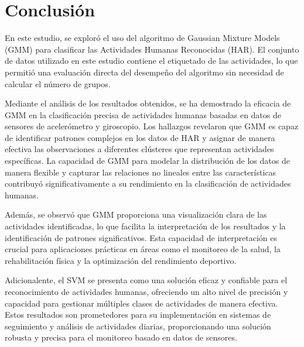 \documentclass{esannV2}
\begin{document}
\section{Conclusión}
En este estudio, se exploró el uso del algoritmo de Gaussian Mixture Models (GMM) para clasificar las Actividades Humanas Reconocidas (HAR). El conjunto de datos utilizado en este estudio contiene el etiquetado de las actividades, lo que permitió una evaluación directa del desempeño del algoritmo sin necesidad de calcular el número de grupos.

Mediante el análisis de los resultados obtenidos, se ha demostrado la eficacia de GMM en la clasificación precisa de actividades humanas basadas en datos de sensores de acelerómetro y giroscopio. Los hallazgos revelaron que GMM es capaz de identificar patrones complejos en los datos de HAR y asignar de manera efectiva las observaciones a diferentes clústeres que representan actividades específicas. La capacidad de GMM para modelar la distribución de los datos de manera flexible y capturar las relaciones no lineales entre las características contribuyó significativamente a su rendimiento en la clasificación de actividades humanas.

Además, se observó que GMM proporciona una visualización clara de las actividades identificadas, lo que facilita la interpretación de los resultados y la identificación de patrones significativos. Esta capacidad de interpretación es crucial para aplicaciones prácticas en áreas como el monitoreo de la salud, la rehabilitación física y la optimización del rendimiento deportivo.

Adicionalente, el SVM se presenta como una solución eficaz y confiable para el reconocimiento de actividades humanas, ofreciendo un alto nivel de precisión y capacidad para gestionar múltiples clases de actividades de manera efectiva. Estos resultados son prometedores para su implementación en sistemas de seguimiento y análisis de actividades diarias, proporcionando una solución robusta y precisa para el monitoreo basado en datos de sensores.



\begin{footnotesize}









%
%

\end{footnotesize}

\end{document}
